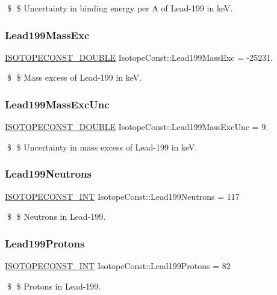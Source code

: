 \$ \$ Uncertainty in binding energy per A of Lead-\/199 in keV. \mbox{\label{group___isotope_const-_lead-_pb199_gaa448ac526347b48c87d61bbc1ca9f7ed}} 
\subsubsection{\texorpdfstring{Lead199\+Mass\+Exc}{Lead199MassExc}}
{\footnotesize\ttfamily \mbox{\hyperlink{group___isotope_const-_macros_ga8f45a7272ce02c0b4c65c44636ed719a}{I\+S\+O\+T\+O\+P\+E\+C\+O\+N\+S\+T\+\_\+\+D\+O\+U\+B\+LE}} Isotope\+Const\+::\+Lead199\+Mass\+Exc = -\/25231.}

\$ \$ Mass excess of Lead-\/199 in keV. \mbox{\label{group___isotope_const-_lead-_pb199_ga0d311a5ebc2b9100cb879ae02452d0b1}} 
\subsubsection{\texorpdfstring{Lead199\+Mass\+Exc\+Unc}{Lead199MassExcUnc}}
{\footnotesize\ttfamily \mbox{\hyperlink{group___isotope_const-_macros_ga8f45a7272ce02c0b4c65c44636ed719a}{I\+S\+O\+T\+O\+P\+E\+C\+O\+N\+S\+T\+\_\+\+D\+O\+U\+B\+LE}} Isotope\+Const\+::\+Lead199\+Mass\+Exc\+Unc = 9.}

\$ \$ Uncertainty in mass excess of Lead-\/199 in keV. \mbox{\label{group___isotope_const-_lead-_pb199_ga594f7d640d1b24c4b0183cbc2270c314}} 
\subsubsection{\texorpdfstring{Lead199\+Neutrons}{Lead199Neutrons}}
{\footnotesize\ttfamily \mbox{\hyperlink{group___isotope_const-_macros_ga5f18360b3e99483a35c32d789e62621c}{I\+S\+O\+T\+O\+P\+E\+C\+O\+N\+S\+T\+\_\+\+I\+NT}} Isotope\+Const\+::\+Lead199\+Neutrons = 117}

\$ \$ Neutrons in Lead-\/199. \mbox{\label{group___isotope_const-_lead-_pb199_ga5a20a744cb023a45aa2b161dfca3f4d5}} 
\subsubsection{\texorpdfstring{Lead199\+Protons}{Lead199Protons}}
{\footnotesize\ttfamily \mbox{\hyperlink{group___isotope_const-_macros_ga5f18360b3e99483a35c32d789e62621c}{I\+S\+O\+T\+O\+P\+E\+C\+O\+N\+S\+T\+\_\+\+I\+NT}} Isotope\+Const\+::\+Lead199\+Protons = 82}

\$ \$ Protons in Lead-\/199. 